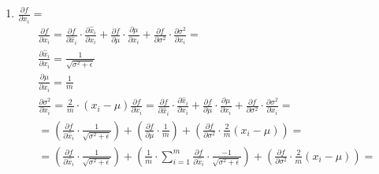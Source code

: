 \documentclass[10pt]{article}
\begin{document}
\begin{enumerate}[label=(\alph*)]
\item \textbf{$\frac{\partial f}{\partial x_i} = $} \\
\begin{equation}
\begin{array}{l}
\frac{\partial f}{\partial x_{i}}=\frac{\partial f}{\partial \hat{x}_{i}} \cdot \frac{\partial \hat{x}_{i}}{\partial x_{i}}+\frac{\partial f}{\partial \mu} \cdot \frac{\partial \mu}{\partial x_{i}}+\frac{\partial f}{\partial \sigma^{2}} \cdot \frac{\partial \sigma^{2}}{\partial x_{i}}= \\
{\frac{\partial \hat{x}_{i}}{\partial x_{i}}=\frac{1}{\sqrt{\sigma^{2}+\epsilon}}} \\
{\frac{\partial \mu}{\partial x_{i}}=\frac{1}{m}} \\ {\frac{\partial \sigma^{2}}{\partial x_{i}}=\frac{2}{m} \cdot\left(x_{i}-\mu\right)}
{\frac{\partial f}{\partial x_{i}}=\frac{\partial f}{\partial \hat{x}_{i}} \cdot \frac{\partial \hat{x}_{i}}{\partial x_{i}}+\frac{\partial f}{\partial \mu} \cdot \frac{\partial \mu}{\partial x_{i}}+\frac{\partial f}{\partial \sigma^{2}} \cdot \frac{\partial \sigma^{2}}{\partial x_{i}}=} \\ {=\left(\frac{\partial f}{\partial \hat{x}_{i}} \cdot \frac{1}{\sqrt{\sigma^{2}+\epsilon}}\right)+\left(\frac{\partial f}{\partial \mu} \cdot \frac{1}{m}\right)+\left(\frac{\partial f}{\partial \sigma^{2}} \cdot \frac{2}{m}\left(x_{i}-\mu\right)\right)=} \\ {=\left(\frac{\partial f}{\partial \hat{x}_{i}} \cdot \frac{1}{\sqrt{\sigma^{2}+\epsilon}}\right)+\left(\frac{1}{m} \cdot \sum_{i=1}^{m} \frac{\partial f}{\partial \hat{x}_{i}} \cdot \frac{-1}{\sqrt{\sigma^{2}+\epsilon}}\right)+\left(\frac{\partial f}{\partial \sigma^{2}} \cdot \frac{2}{m}\left(x_{i}-\mu\right)\right)=}\\ 

\end{array}
\end{equation}
\end{enumerate}
\end{document}
